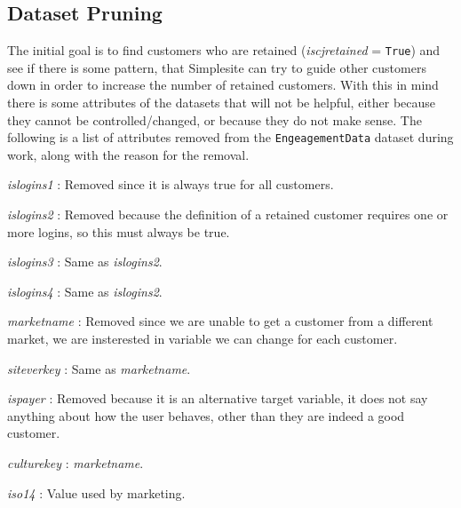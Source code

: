 \subsection{Dataset Pruning}
\label{sec:datasetpruning}

The initial goal is to find customers who are retained (\textit{iscjretained} =
\texttt{True}) and see if there is some pattern, that Simplesite can try to
guide other customers down in order to increase the number of retained
customers. With this in mind there is some attributes of the datasets that will
not be helpful, either because they cannot be controlled/changed, or because
they do not make sense. The following is a list of attributes removed from the
\texttt{EngeagementData} dataset during work, along with the reason for the
removal.

\begin{itemize*}
  \item \textit{islogins1} : Removed since it is always true for all customers.

	\item \textit{islogins2} : Removed because the definition of a retained
	      customer requires one or more logins, so this must always be true.

	\item \textit{islogins3} : Same as \textit{islogins2}.

	\item \textit{islogins4} : Same as \textit{islogins2}.

	\item \textit{marketname} : Removed since we are unable to get a customer from
	      a different market, we are insterested in variable we can change for
	      each customer.

	\item \textit{siteverkey} : Same as \textit{marketname}.

	\item \textit{ispayer} : Removed because it is an alternative target variable,
	      it does not say anything about how the user behaves, other than they are
	      indeed a good customer.

	\item \textit{culturekey} : \textit{marketname}.

	\item \textit{iso14} : Value used by marketing. 
\end{itemize*}

